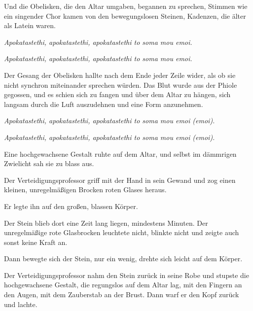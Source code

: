 Und die Obelisken, die den Altar umgaben, begannen zu sprechen, Stimmen wie ein singender Chor kamen von den bewegungslosen Steinen, Kadenzen, die älter als Latein waren.

\emph{Apokatastethi, apokatastethi, apokatastethi to soma mou emoi.}

\emph{Apokatastethi, apokatastethi, apokatastethi to soma mou emoi.}

Der Gesang der Obelisken hallte nach dem Ende jeder Zeile wider, als ob sie nicht synchron miteinander sprechen würden.
Das Blut wurde aus der Phiole gegossen, und es schien sich zu fangen und über dem Altar zu hängen, sich langsam durch die Luft auszudehnen und eine Form anzunehmen.

\emph{Apokatastethi, apokatastethi, apokatastethi to soma mou emoi (emoi).}

\emph{Apokatastethi, apokatastethi, apokatastethi to soma mou emoi (emoi).}

Eine hochgewachsene Gestalt ruhte auf dem Altar, und selbst im dämmrigen Zwielicht sah sie zu blass aus.

Der Verteidigungsprofessor griff mit der Hand in sein Gewand und zog einen kleinen, unregelmäßigen Brocken roten Glases heraus.

Er legte ihn auf den großen, blassen Körper.

Der Stein blieb dort eine Zeit lang liegen, mindestens Minuten. Der unregelmäßige rote Glasbrocken leuchtete nicht, blinkte nicht und zeigte auch sonst keine Kraft an.

Dann bewegte sich der Stein, nur ein wenig, drehte sich leicht auf dem Körper.

Der Verteidigungsprofessor nahm den Stein zurück in seine Robe und stupste die hochgewachsene Gestalt, die regungslos auf dem Altar lag, mit den Fingern an den Augen, mit dem Zauberstab an der Brust. Dann warf er den Kopf zurück und lachte.

